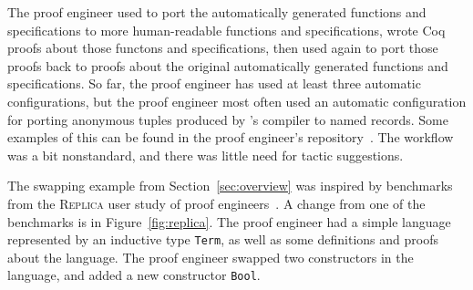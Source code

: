 The proof engineer used \toolname to port the automatically generated functions and specifications to more
human-readable functions and specifications, wrote Coq proofs about those functons and specifications, then
used \toolname again to port those proofs back to
proofs about the original automatically generated functions and specifications.
So far, the proof engineer has used at least three automatic configurations,
but the proof engineer most often used an automatic configuration for porting anonymous tuples produced by \company's compiler
to named records.
Some examples of this can be found in the proof engineer's repository~. %
The workflow was a bit nonstandard,
and there was little need for tactic suggestions.

\begin{figure*}
\begin{minipage}{0.48\textwidth}
   
\end{minipage}
\hfill
\begin{minipage}{0.48\textwidth}
   
\end{minipage}
\vspace{-0.4cm}
\caption{A simple language (left) and the same language with two swapped constructors and an added constructor (right).}
\label{fig:replica}
\end{figure*}

The swapping example from Section~\ref{sec:overview} was inspired by benchmarks 
from the \textsc{Replica} user study of proof engineers~\cite{replica}.
A change from one of the benchmarks is in Figure~\ref{fig:replica}.
The proof engineer had a simple language represented by an inductive type \lstinline{Term},
as well as some definitions and proofs about the language.
The proof engineer swapped two constructors in the language,
and added a new constructor \lstinline{Bool}.

